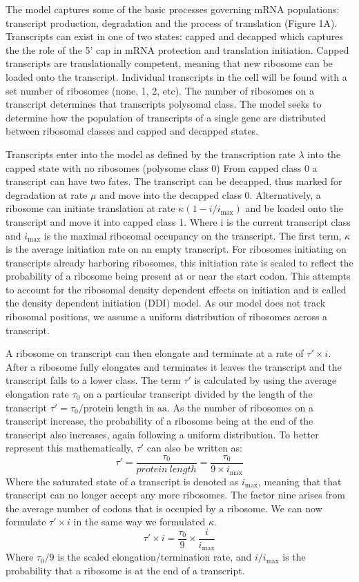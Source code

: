 \documentclass[review]{elsarticle}
\newcommand{\imax}{\ensuremath{i_{\max}}\xspace}
\begin{document}
The model captures some of the basic processes governing mRNA populations: transcript production, degradation and the process of translation (Figure 1A).
Transcripts can exist in one of two states: capped and decapped which captures the the role of the 5' cap in mRNA protection and translation initiation. 
Capped transcripts are translationally competent, meaning that new ribosome can be loaded onto the transcript. 
Individual transcripts in the cell will be found with a set number of ribosomes (none, 1, 2, etc).
The number of ribosomes on a transcript determines that transcripts polysomal class.
The model seeks to determine how the population of transcripts of a single gene are distributed between ribosomal classes and capped and decapped states.

Transcripts enter into the model as defined by the transcription rate $\lambda$ into the capped state with no ribosomes (polysome class 0)
From capped class 0 a transcript can have two fates. 
The transcript can be decapped, thus marked for degradation at rate $\mu$ and move into the decapped class 0.
Alternatively, a ribosome can initiate translation at rate $\kappa(1-i/\imax)$ and be loaded onto the transcript and move it into capped class 1.
Where i is the current transcript class and \imax is the maximal ribosomal occupancy on the transcript. 
The first term, $\kappa$ is the average initiation rate on an empty transcript. 
For ribosomes initiating on transcripts already harboring ribosomes, this initiation rate is scaled to reflect the probability of a ribosome being present at or near the start codon. 
This attempts to account for the ribosomal density dependent effects on initiation and is called the density dependent initiation (DDI) model.
As our model does not track ribosomal positions, we assume a uniform distribution of ribosomes across a transcript.

A ribosome on transcript can then elongate and terminate at a rate of $\tau' \times  i$. After a ribosome fully elongates and terminates it leaves the transcript and the transcript falls to a lower class.
The term $\tau'$ is calculated by using the average elongation rate $\tau_0$ on a particular transcript divided by the length of the transcript $\tau'=\tau_0/\text{protein length in aa}$.
As the number of ribosomes on a transcript increase, the probability of a ribosome being at the end of the transcript also increases, again following a uniform distribution. 
To better represent this mathematically, $\tau'$ can also  be written as:
\begin{equation}
	\tau' = \frac{\tau_0}{protein \: length} = \frac{\tau_0}{9\times \imax}
\end{equation}
Where the saturated state of a transcript is denoted as \imax, meaning that that transcript can no longer accept any more ribosomes. The factor nine arises from the average number of codons that is occupied by a ribosome. 
We can now formulate $\tau' \times i$ in the same way we formulated $\kappa$. 
\begin{equation}
	\tau' \times i = \frac{\tau_0}{9} \times \frac{i}{\imax}
\end{equation}
Where $\tau_0/9$ is the scaled elongation/termination rate, and $i/\imax$ is the probability that a ribosome is at the end of a transcript.
\end{document}
